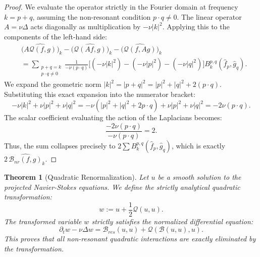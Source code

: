 \documentclass[12pt,a4paper]{article}
\theoremstyle{plain}
\newtheorem{theorem}{Theorem}[section]
\theoremstyle{definition}
\theoremstyle{remark}
\newcommand{\BB}{\mathcal{B}}
\newcommand{\Bnr}{\mathcal{B}_{nr}}
\newcommand{\Bres}{\mathcal{B}_{res}}
\newcommand{\QQ}{\mathcal{Q}}
\begin{document}
\begin{proof}
We evaluate the operator strictly in the Fourier domain at frequency $k = p+q$, assuming the non-resonant condition $p \cdot q \neq 0$. The linear operator $A = \nu \Delta$ acts diagonally as multiplication by $-\nu|k|^2$. Applying this to the components of the left-hand side:
\begin{align*}
  &\big(\widehat{A\QQ(f,g)}\big)_k - \big(\widehat{\QQ(Af,g)}\big)_k - \big(\widehat{\QQ(f,Ag)}\big)_k \\
  &= \sum_{\substack{p+q=k\\p\cdot q\neq 0}} \frac{1}{-\nu(p\cdot q)} \Big[ (-\nu|k|^2) - (-\nu|p|^2) - (-\nu|q|^2) \Big] B_k^{p,q}(\hat{f}_p,\hat{g}_q).
\end{align*}
We expand the geometric norm $|k|^2 = |p+q|^2 = |p|^2 + |q|^2 + 2(p \cdot q)$. Substituting this exact expansion into the numerator bracket:
\[
  -\nu|k|^2 + \nu|p|^2 + \nu|q|^2 = -\nu(|p|^2 + |q|^2 + 2p\cdot q) + \nu|p|^2 + \nu|q|^2 = -2\nu(p \cdot q).
\]
The scalar coefficient evaluating the action of the Laplacians becomes:
\[
  \frac{-2\nu(p\cdot q)}{-\nu(p\cdot q)} = 2.
\]
Thus, the sum collapses precisely to $2 \sum B_k^{p,q}(\hat{f}_p,\hat{g}_q)$, which is exactly $2\,\widehat{\Bnr(f,g)}_k$.
\end{proof}

\begin{theorem}[Quadratic Renormalization]
\label{thm:NF}
Let $u$ be a smooth solution to the projected Navier-Stokes equations. We define the strictly analytical quadratic transformation:
\[
  w := u + \frac{1}{2}\QQ(u,u).
\]
The transformed variable $w$ strictly satisfies the normalized differential equation:
\[
  \partial_t w - \nu\Delta w = \Bres(u,u) + \QQ(\BB(u,u),u).
\]
This proves that all non-resonant quadratic interactions are exactly eliminated by the transformation.
\end{theorem}
\end{document}
